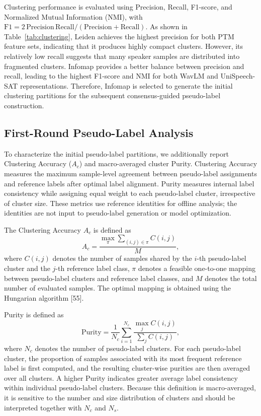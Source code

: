 \documentclass[journal]{IEEEtran}
\begin{document}
Clustering performance is evaluated using Precision, Recall, F1-score,
and Normalized Mutual Information (NMI), with
$\mathrm{F1}=2\,\mathrm{Precision}\,\mathrm{Recall}/
(\mathrm{Precision}+\mathrm{Recall})$.
As shown in Table~\ref{tab:clustering}, Leiden achieves the highest
precision for both PTM feature sets, indicating that it produces highly
compact clusters.
However, its relatively low recall suggests that many speaker samples
are distributed into fragmented clusters.
Infomap provides a better balance between precision and recall, leading
to the highest F1-score and NMI for both WavLM and UniSpeech-SAT
representations.
Therefore, Infomap is selected to generate the initial clustering
partitions for the subsequent consensus-guided pseudo-label
construction.
\subsection{First-Round Pseudo-Label Analysis}
\label{sec:first_round_analysis}

To characterize the initial pseudo-label partitions, we additionally report
Clustering Accuracy ($A_c$) and macro-averaged cluster Purity. Clustering
Accuracy measures the maximum sample-level agreement between pseudo-label
assignments and reference labels after optimal label alignment. Purity
measures internal label consistency while assigning equal weight to each
pseudo-label cluster, irrespective of cluster size. These metrics use
reference identities for offline analysis; the identities are not input to
pseudo-label generation or model optimization.


The Clustering Accuracy $A_c$ is defined as \begin{equation} A_c = \frac{ \max\limits_{\pi} \sum_{(i,j)\in\pi} C(i,j) }{M}, \end{equation} where $C(i,j)$ denotes the number of samples shared by the $i$-th pseudo-label cluster and the $j$-th reference label class, $\pi$ denotes a feasible one-to-one mapping between pseudo-label clusters and reference label classes, and $M$ denotes the total number of evaluated samples. The optimal mapping is obtained using the Hungarian algorithm [55].


Purity is defined as \begin{equation} \mathrm{Purity} = \frac{1}{N_c} \sum_{i=1}^{N_c} \frac{\max_j C(i,j)} {\sum_j C(i,j)}, \end{equation} where $N_c$ denotes the number of pseudo-label clusters. For each pseudo-label cluster, the proportion of samples associated with its most frequent reference label is first computed, and the resulting cluster-wise purities are then averaged over all clusters. A higher Purity indicates greater average label consistency within individual pseudo-label clusters. Because this definition is macro-averaged, it is sensitive to the number and size distribution of clusters and should be interpreted together with $N_c$ and $N_s$.
\end{document}
